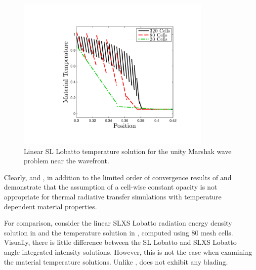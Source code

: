 %
%
\begin{figure}[!htp]
\centering
\includegraphics[width=9.5cm,trim=1.2in  0.2in 0.75in 0.5in,clip=true]{chapter6_grey_radtran/Dissertation_Data/Reorder_Blading_Temperature_Zoom_MultiCell.pdf}
\caption{Linear SL Lobatto temperature solution for the unity Marshak wave problem near the wavefront.}
\label{fig:bladed_t_profile_zoom}
\end{figure}
Clearly,  and , in addition to the limited order of convergence results of  and  demonstrate that the assumption of a cell-wise constant opacity is not appropriate for thermal radiative transfer simulations with temperature dependent material properties.

For comparison, consider the linear SLXS Lobatto radiation energy density solution in  and the temperature solution in , computed using 80 mesh cells.
Visually, there is little difference between the SL Lobatto and SLXS Lobatto angle integrated intensity solutions.
However, this is not the case when examining the material temperature solutions.  
Unlike ,  does not exhibit any blading.

